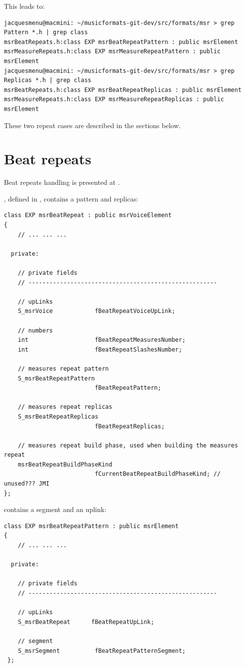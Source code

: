 This leads to:
\begin{lstlisting}[language=Terminal]
jacquesmenu@macmini: ~/musicformats-git-dev/src/formats/msr > grep Pattern *.h | grep class
msrBeatRepeats.h:class EXP msrBeatRepeatPattern : public msrElement
msrMeasureRepeats.h:class EXP msrMeasureRepeatPattern : public msrElement
jacquesmenu@macmini: ~/musicformats-git-dev/src/formats/msr > grep Replicas *.h | grep class
msrBeatRepeats.h:class EXP msrBeatRepeatReplicas : public msrElement
msrMeasureRepeats.h:class EXP msrMeasureRepeatReplicas : public msrElement
\end{lstlisting}

These two repeat cases are described in the sections below.


\section{Beat repeats}\label{Beat repeats}

Beat repeats handling is presented at .

, defined in , contains a pattern and replicas:
\begin{lstlisting}[language=CPlusPlus]
class EXP msrBeatRepeat : public msrVoiceElement
{
	// ... ... ...

  private:

    // private fields
    // ------------------------------------------------------

    // upLinks
    S_msrVoice            fBeatRepeatVoiceUpLink;

    // numbers
    int                   fBeatRepeatMeasuresNumber;
    int                   fBeatRepeatSlashesNumber;

    // measures repeat pattern
    S_msrBeatRepeatPattern
                          fBeatRepeatPattern;

    // measures repeat replicas
    S_msrBeatRepeatReplicas
                          fBeatRepeatReplicas;

    // measures repeat build phase, used when building the measures repeat
    msrBeatRepeatBuildPhaseKind
                          fCurrentBeatRepeatBuildPhaseKind; // unused??? JMI
};
\end{lstlisting}

 contains a segment and an uplink:
\begin{lstlisting}[language=CPlusPlus]
class EXP msrBeatRepeatPattern : public msrElement
{
	// ... ... ...

  private:

    // private fields
    // ------------------------------------------------------

    // upLinks
    S_msrBeatRepeat      fBeatRepeatUpLink;

    // segment
    S_msrSegment          fBeatRepeatPatternSegment;
 };
\end{lstlisting}

